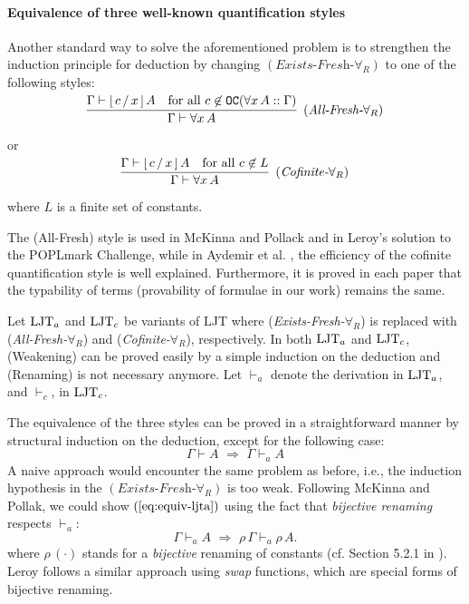 \documentclass{svjour3}                     %
\newcommand{\seqr}[3]{\rbm{\infer{#2}{#1}}\;\;\text{$#3$}}
\newcommand{\Ga}{\Gamma}
\newcommand{\vd}{\vdash}
\newcommand{\substs}[3]{[\, #3\, \slash\, #2\,]\, #1}
\newcommand{\rbm}[1]{\raisebox{-1.5ex}[0.5ex]{$#1$}}
\newcommand{\tOC}{\textup{\tt OC}}
\newcommand{\ljt}{\textup{LJT}}
\newcommand{\ljta}{\textup{LJT}_a}
\newcommand{\vda}{\vdash_{\!\!\!a}}
\newcommand{\vdc}{\vdash_{\!\!\!c}}
\begin{document}
\paragraph{\bf Equivalence of three well-known quantification styles} 
Another standard way to solve the aforementioned problem is to strengthen the induction principle for deduction by changing $(\textit{Exists-Fresh-}\forall_R)$ to one of the following styles:

\[
  \seqr
  {\Ga \vd \substs{A}{x}{c} & \text{for all } c \not\in \tOC(\forall x\,A :: \Ga)}
  {\Ga \vd \forall x\, A}
  {(\textit{All-Fresh-}\forall_R)}
\]

\noindent or

\[
  \seqr
  {\Ga \vd \substs{A}{x}{c} & \text{for all } c \not\in L}
  {\Ga \vd \forall x\, A}
  {(\textit{Cofinite-}\forall_R)}
\]

\noindent where $L$ is a finite set of constants. 

The (All-Fresh) style is used in McKinna and Pollack \cite{mcpol93,mcpol99} and in Leroy's solution \cite{leroy-nameless} to the POPLmark Challenge, while in Aydemir et al. \cite{engineering}, the efficiency of the cofinite quantification style is well explained. Furthermore, it is proved in each paper that the typability of terms (provability of formulae in our work) remains the same.

Let $\ljt_{a}$ and $\ljt_{c}$ be variants of LJT where ({\it Exists-Fresh-}$\forall_R$) is replaced with ({\it All-Fresh-}$\forall_R$) and ({\it Cofinite-}$\forall_R$), respectively. In both $\ljt_{a}$ and $\ljt_{c}$, (Weakening) can be proved easily by a simple induction on the deduction and (Renaming) is not necessary anymore. Let $\vda$ denote the derivation in $\ljta$, and $\vdc$, in $\ljt_c$.

The equivalence of the three styles can be proved in a straightforward manner by structural induction on the deduction, except for the following case:
\begin{equation}
  \label{eq:equiv-ljta}
  \Ga \vd A \,\,\Rightarrow\,\, \Ga \vda A  
\end{equation}
A naive approach would encounter the same problem as before, i.e., the
induction hypothesis in the $(\textit{Exists-Fresh-}\forall_R)$ is too
weak. Following McKinna and Pollak, we could show $(\ref{eq:equiv-ljta})$
using the fact
that \textit{bijective renaming} respects $\vda$:
\begin{equation}
  \label{eq:bij-renaming}
  \Ga \vda A \,\,\Rightarrow\,\, \rho\,\Ga \vda \rho\, A.
\end{equation}
where $\rho\,(\cdot)$ stands for a {\em bijective} renaming of constants (cf. Section 5.2.1 in \cite{mcpol99}). 
Leroy \cite{leroy-nameless} follows a similar approach using \textit{swap} functions, which are special forms of bijective renaming.
\end{document}
